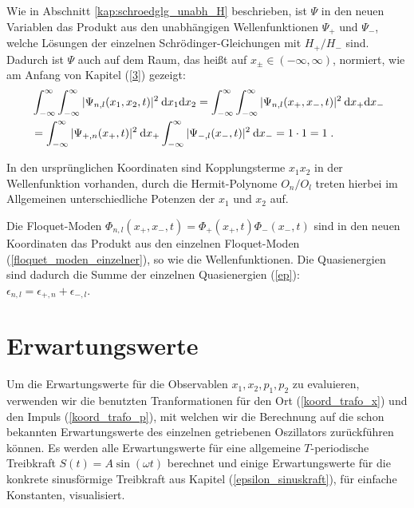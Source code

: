   Wie in Abschnitt \ref{kap:schroedglg_unabh_H} beschrieben, ist $\Psi$ in den neuen Variablen das Produkt aus den unabhängigen Wellenfunktionen $\Psi_+$ und $\Psi_-$, welche Lösungen der einzelnen Schrödinger-Gleichungen mit $H_+/H_-$ sind. Dadurch ist $\Psi$ auch auf dem Raum, das heißt auf $x_\pm \in (-\infty,\infty)$, normiert, wie am Anfang von Kapitel (\ref{3}) gezeigt:
  \begin{align}
    &\int_{-\infty}^{\infty}\int_{-\infty}^{\infty} |\Psi_{n,l}(x_1,x_2,t)|^2 \: \text dx_1\text dx_2
    =\int_{-\infty}^{\infty}\int_{-\infty}^{\infty} |\Psi_{n,l}(x_+,x_-,t)|^2 \: \text dx_+\text dx_- \notag\\
    &=\int_{-\infty}^{\infty} |\Psi_{+,n}(x_+,t)|^2 \: \text dx_+ \int_{-\infty}^{\infty} |\Psi_{-,l}(x_-,t)|^2 \: \text dx_-
    = 1 \cdot 1 = 1 \; .
    \label{norm_gekoppelt}
  \end{align}

  In den ursprünglichen Koordinaten sind Kopplungsterme $x_1x_2$ in der Wellenfunktion vorhanden, durch die Hermit-Polynome $O_n/O_l$ treten hierbei im Allgemeinen unterschiedliche Potenzen der $x_1$ und $x_2$ auf.

  Die Floquet-Moden $\Phi_{n,l}(x_+,x_-,t)=\Phi_+(x_+,t)\Phi_-(x_-,t)$ sind in den neuen Koordinaten das Produkt aus den einzelnen Floquet-Moden (\ref{floquet_moden_einzelner}), so wie die Wellenfunktionen.
  Die Quasienergien sind dadurch die Summe der einzelnen Quasienergien (\ref{ep}):\\ $\epsilon_{n,l}=\epsilon_{+,n}+\epsilon_{-,l}$.


\section{Erwartungswerte}
  \label{erwartungswerte_gekoppelt}
  Um die Erwartungswerte für die Observablen $x_1,x_2,p_1,p_2$ zu evaluieren, verwenden wir die benutzten Tranformationen für den Ort (\ref{koord_trafo_x}) und den Impuls (\ref{koord_trafo_p}), mit welchen wir die Berechnung auf die schon bekannten Erwartungswerte des einzelnen getriebenen Oszillators zurückführen können.
  Es werden alle Erwartungswerte für eine allgemeine $T$-periodische Treibkraft $S(t)=A\sin(\omega t)$ berechnet und einige Erwartungswerte für die konkrete sinusförmige Treibkraft aus Kapitel (\ref{epsilon_sinuskraft}), für einfache Konstanten, visualisiert.

